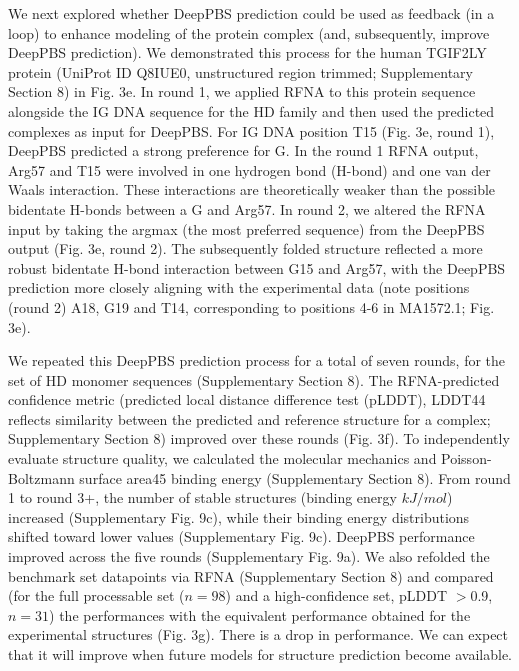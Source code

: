 \par
We next explored whether DeepPBS prediction could be used as feedback (in a loop) to enhance modeling of the protein complex (and, subsequently, improve DeepPBS prediction). We demonstrated this process for the human TGIF2LY protein (UniProt ID Q8IUE0, unstructured region trimmed; Supplementary Section 8) in Fig. 3e. In round 1, we applied RFNA to this protein sequence alongside the IG DNA sequence for the HD family and then used the predicted complexes as input for DeepPBS. For IG DNA position T15 (Fig. 3e, round 1), DeepPBS predicted a strong preference for G. In the round 1 RFNA output, Arg57 and T15 were involved in one hydrogen bond (H-bond) and one van der Waals interaction. These interactions are theoretically weaker than the possible bidentate H-bonds between a G and Arg57. In round 2, we altered the RFNA input by taking the argmax (the most preferred sequence) from the DeepPBS output (Fig. 3e, round 2). The subsequently folded structure reflected a more robust bidentate H-bond interaction between G15 and Arg57, with the DeepPBS prediction more closely aligning with the experimental data (note positions (round 2) A18, G19 and T14, corresponding to positions 4-6 in MA1572.1; Fig. 3e).
\par
We repeated this DeepPBS prediction process for a total of seven rounds, for the set of HD monomer sequences (Supplementary Section 8). The RFNA-predicted confidence metric (predicted local distance difference test (pLDDT), LDDT44 reflects similarity between the predicted and reference structure for a complex; Supplementary Section 8) improved over these rounds (Fig. 3f). To independently evaluate structure quality, we calculated the molecular mechanics and Poisson-Boltzmann surface area45 binding energy (Supplementary Section 8). From round 1 to round 3+, the number of stable structures (binding energy $kJ/mol$) increased (Supplementary Fig. 9c), while their binding energy distributions shifted toward lower values (Supplementary Fig. 9c). DeepPBS performance improved across the five rounds (Supplementary Fig. 9a). We also refolded the benchmark set datapoints via RFNA (Supplementary Section 8) and compared (for the full processable set ($n=98$) and a high-confidence set, pLDDT $>$0.9, $n=31$) the performances with the equivalent performance obtained for the experimental structures (Fig. 3g). There is a drop in performance. We can expect that it will improve when future models for structure prediction become available.
\par
